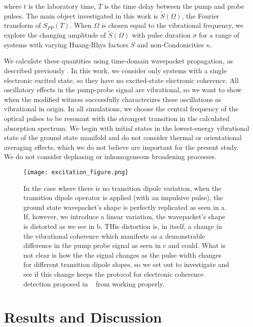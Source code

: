 where $t$ is the laboratory time, $T$ is the time delay between the pump and probe pulses. The main object investigated in this work is $\tilde{S}(\Omega)$, the Fourier transform of $S_{PP}(T)$. When $\Omega$ is chosen equal to the vibrational frequency, we explore the changing amplitude of $\tilde{S}(\Omega)$ with pulse duration $\sigma$ for a range of systems with varying Huang-Rhys factors $S$ and non-Condonicities $\kappa$.

We calculate these quantities using time-domain wavepacket propagation, as described previously \cite{Mukamel1995,UFSwavepackets,Tannor2007,technique}.  In this work, we consider only systems with a single electronic excited state, so they have no excited-state electronic coherence. All oscillatory effects in the pump-probe signal are vibrational, so we want to show when the modified witness successfully characterizes these oscillations as vibrational in origin. In all simulations, we choose the central frequency of the optical pulses to be resonant with the strongest transition in the calculated absorption spectrum. We begin with initial states in the lowest-energy vibrational state of the ground state manifold and do not consider thermal or orientational averaging effects, which we do not believe are important for the present study. We do not consider dephasing or inhomogeneous broadening processes.

\begin{figure}
   \texttt{[image: excitation\_figure.png]}
   \caption{In the case where there is no transition dipole variation, when the transition dipole operator is applied (with an impulsive pulse), the ground state wavepacket's shape is perfectly replicated as seen in a.  If, however, we introduce a linear variation, the wavepacket's shape is distorted as we see in b.  THis distortion is, in itself, a change in the vibrational coherence which manifests as a demonstrable difference in the pump probe signal as seen in c and could.  What is not clear is how the the signal changes as the pulse width changes for different transition dipole slopes, so we set out to investigate and see if this change keeps the protocol for electronic coherence detection proposed in ~\cite{witness,allanWitness} from working properly.  }
	\label{fig:physicalIllustration}
\end{figure}


\section{Results and Discussion}

